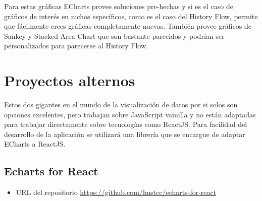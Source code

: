 Para estas gráficas ECharts provee soluciones pre-hechas y si es el caso de gráficos de interés en nichos específicos, como es el caso del History Flow, permite que fácilmente crees gráficas completamente nuevas.
También provee gráficos de Sankey y Stacked Area Chart que son bastante parecidos y podrían ser personalizados para parecerse al History Flow.

\section{ Proyectos alternos }
Estos dos gigantes en el mundo de la visualización de datos por si solos son opciones excelentes, pero trabajan sobre JavaScript vainilla y no están adaptadas para trabajar directamente sobre tecnologías como ReactJS. 
Para facilidad del desarrollo de la aplicación se utilizará una librería que se encargue de adaptar ECharts a ReactJS.

\subsection{ Echarts for React }
\begin{itemize}
    \item URL del repositorio \href{https://github.com/hustcc/echarts-for-react}{https://github.com/hustcc/echarts-for-react}
\end{itemize}